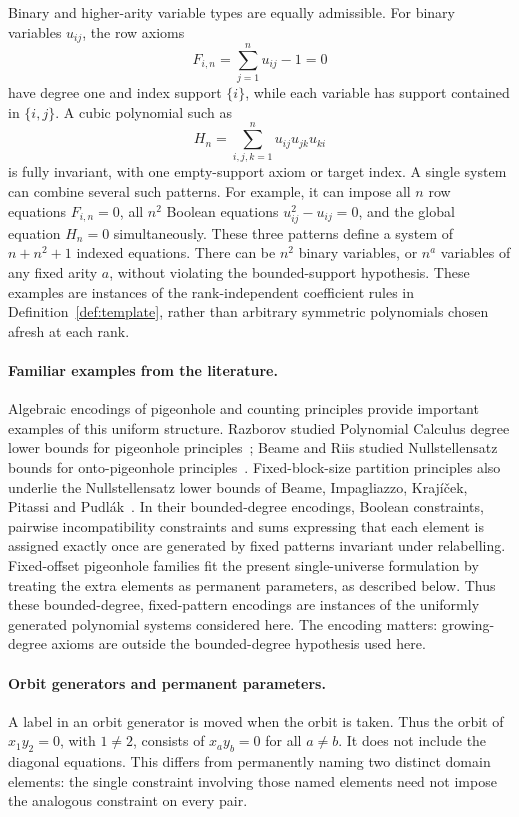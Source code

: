 \documentclass[11pt,a4paper]{article}
\theoremstyle{definition}\newtheorem{definition}[theorem]{Definition}
\theoremstyle{remark}\newtheorem{remark}[theorem]{Remark}
\begin{document}
Binary and higher-arity variable types are equally admissible. For
binary variables $u_{ij}$, the row axioms
\[
               F_{i,n}=\sum_{j=1}^{n}u_{ij}-1=0
\]
have degree one and index support $\{i\}$, while each variable has
support contained in $\{i,j\}$. A cubic polynomial such as
\[
       H_n=\sum_{i,j,k=1}^{n}u_{ij}u_{jk}u_{ki}
\]
is fully invariant, with one empty-support axiom or target index.
A single system can combine several such patterns. For example, it can
impose all $n$ row equations $F_{i,n}=0$, all $n^2$ Boolean equations
$u_{ij}^2-u_{ij}=0$, and the global equation $H_n=0$ simultaneously.
These three patterns define a system of $n+n^2+1$ indexed equations.
There can be $n^2$ binary variables, or $n^a$ variables of any fixed
arity $a$, without violating the bounded-support hypothesis. These
examples are instances of the rank-independent coefficient rules in
Definition~\ref{def:template}, rather than arbitrary symmetric
polynomials chosen afresh at each rank.

\paragraph{Familiar examples from the literature.}
Algebraic encodings of pigeonhole and counting principles provide
important examples of this uniform structure. Razborov studied
Polynomial Calculus degree lower bounds for pigeonhole
principles~\cite{RazborovPC}; Beame and Riis studied Nullstellensatz
bounds for onto-pigeonhole principles~\cite{BeameRiis}. Fixed-block-size
partition principles also underlie the Nullstellensatz lower bounds of
Beame, Impagliazzo, Kraj\'{i}\v{c}ek, Pitassi and
Pudl\'{a}k~\cite{NSFoundations}. In their bounded-degree encodings,
Boolean constraints, pairwise incompatibility constraints and sums
expressing that each element is assigned exactly once are generated by
fixed patterns invariant under relabelling. Fixed-offset pigeonhole
families fit the present single-universe formulation by treating the
extra elements as permanent parameters, as described below. Thus these bounded-degree, fixed-pattern encodings are instances of
the uniformly generated polynomial systems considered here.
The encoding matters: growing-degree axioms are outside the
bounded-degree hypothesis used here.

\paragraph{Orbit generators and permanent parameters.}
A label in an orbit generator is moved when the orbit is taken. Thus
the orbit of $x_1y_2=0$, with $1\ne2$, consists of $x_ay_b=0$ for
all $a\ne b$. It does not include the diagonal equations. This differs
from permanently naming two distinct domain elements: the single
constraint involving those named elements need not impose the analogous
constraint on every pair.
\end{document}
